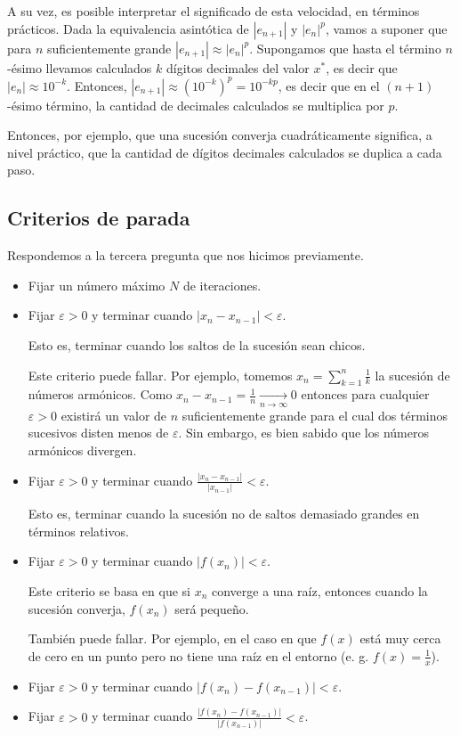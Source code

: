 A su vez, es posible interpretar el significado de esta velocidad, en términos prácticos. Dada la equivalencia asintótica de $|e_{n + 1}|$ y $|e_n|^p$, vamos a suponer que para $n$ suficientemente grande $|e_{n + 1}| \approx |e_n|^p$. Supongamos que hasta el término $n$-ésimo llevamos calculados $k$ dígitos decimales del valor $x^*$, es decir que $|e_n| \approx 10^{-k}$. Entonces, $|e_{n + 1}| \approx (10^{-k})^p = 10^{-kp}$, es decir que en el $(n + 1)$-ésimo término, la cantidad de decimales calculados se multiplica por $p$.

Entonces, por ejemplo, que una sucesión converja cuadráticamente significa, a nivel práctico, que la cantidad de dígitos decimales calculados se duplica a cada paso.

\subsection{Criterios de parada}
Respondemos a la tercera pregunta que nos hicimos previamente.

\begin{itemize}
	\item Fijar un número máximo $N$ de iteraciones.
	
	\item Fijar $\varepsilon > 0$ y terminar cuando $|x_n - x_{n - 1}| < \varepsilon$. 
	
	Esto es, terminar cuando los saltos de la sucesión sean chicos.
	
	Este criterio puede fallar. Por ejemplo, tomemos $x_n = \sum_{k = 1}^n \frac{1}{k}$ la sucesión de números armónicos. Como $x_n - x_{n - 1} = \frac{1}{n} \xrightarrow[n \to \infty]{} 0$ entonces para cualquier $\varepsilon > 0$ existirá un valor de $n$ suficientemente grande para el cual dos términos sucesivos disten menos de $\varepsilon$. Sin embargo, es bien sabido que los números armónicos divergen.
	
	\item Fijar $\varepsilon > 0 $ y terminar cuando $\frac{|x_n - x_{n - 1}|}{|x_{n - 1}|} < \varepsilon$. 
	
	Esto es, terminar cuando la sucesión no de saltos demasiado grandes en términos relativos.
	
	\item Fijar $\varepsilon > 0$ y terminar cuando $|f(x_n)| < \varepsilon$. 
	
	Este criterio se basa en que si $x_n$ converge a una raíz, entonces cuando la sucesión converja, $f(x_n)$ será pequeño.
	
	También puede fallar. Por ejemplo, en el caso en que $f(x)$ está muy cerca de cero en un punto pero no tiene una raíz en el entorno (e. g. $f(x) = \frac{1}{x}$).
	
	\item Fijar $\varepsilon > 0$ y terminar cuando $|f(x_n) - f(x_{n - 1})| < \varepsilon$.
	
	\item Fijar $\varepsilon > 0$ y terminar cuando $\frac{|f(x_n) - f(x_{n - 1})|}{|f(x_{n - 1})|} < \varepsilon$.
\end{itemize}

